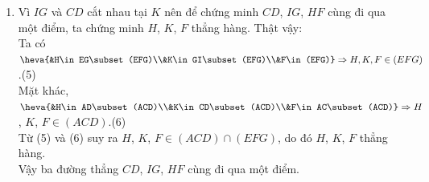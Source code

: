 \begin{bt}
{\begin{enumerate}
			Từ (3) và (4) suy ra $FK=(EFG)\cap (ACD)$.
			\item Vì $IG$ và $CD$ cắt nhau tại $K$ nên để chứng minh $CD$, $IG$, $HF$ cùng đi qua một điểm, ta chứng minh $H$, $K$, $F$ thẳng hàng. Thật vậy:\\
			Ta có $\heva{&H\in EG\subset (EFG)\\&K\in GI\subset (EFG)\\&F\in (EFG)}\Rightarrow H, K, F\in (EFG)$.\hfill (5) \\
			Mặt khác, $\heva{&H\in AD\subset (ACD)\\&K\in CD\subset (ACD)\\&F\in AC\subset (ACD)}\Rightarrow H$, $K$, $F\in (ACD)$.\hfill (6) \\
			Từ (5) và (6) suy ra $H$, $K$, $F\in (ACD)\cap (EFG)$, do đó $H$, $K$, $F$ thẳng hàng.\\
			Vậy ba đường thẳng $CD$, $IG$, $HF$ cùng đi qua một điểm. 
		\end{enumerate}	
	}
\end{bt}

